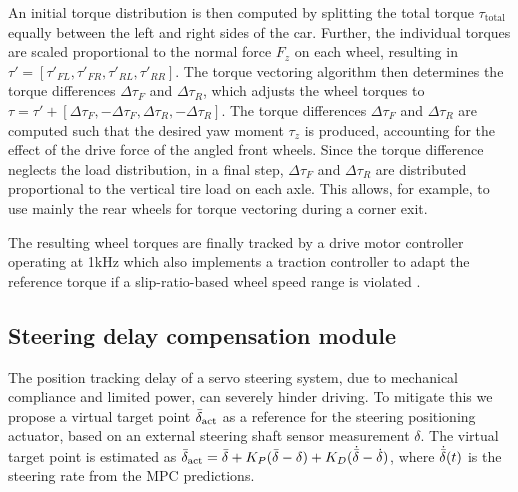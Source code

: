 An initial torque distribution is then computed by splitting the total torque $\tau_{\text{total}}$ equally between the left and right sides of the car. Further, the individual torques are scaled proportional to the normal force $F_z$ on each wheel, resulting in $\tau'=[\tau'_{FL}, \tau'_{FR},\tau'_{RL},\tau'_{RR}]$. The torque vectoring algorithm then determines the torque differences $\Delta\tau_F$ and $\Delta\tau_R$, which adjusts the wheel torques to $\tau=\tau' + [ \Delta\tau_F, -\Delta\tau_F, \Delta\tau_R, -\Delta\tau_R]$. The torque differences $\Delta\tau_F$ and $\Delta\tau_R$ are computed such that the desired yaw moment $\tau_z$ is produced, accounting for the effect of the drive force of the angled front wheels. Since the torque difference neglects the load distribution, in a final step, $\Delta\tau_F$ and $\Delta\tau_R$ are distributed proportional to the vertical tire load on each axle. This allows, for example, to use mainly the rear wheels for torque vectoring during a corner exit. 

The resulting wheel torques are finally tracked by a drive motor controller operating at 1kHz which also implements a traction controller to adapt the reference torque if a slip-ratio-based wheel speed range is violated \cite{ev_traction_control}. 

\subsection{Steering delay compensation module}
The position tracking delay of a servo steering system, due to mechanical compliance and limited power, can severely hinder driving.
To mitigate this we propose a virtual target point $\bar{\delta}_{\text{act}}$ as a reference for the steering positioning actuator, based on an external steering shaft sensor measurement $\delta$.
The virtual target point is estimated as 
$\bar{\delta}_{\text{act}} = \bar{\delta} + K_P (\bar{\delta}-\delta) + K_D (\dot{\bar{\delta}} - \dot{\delta})$, where $\dot{\bar{\delta}}(t)$ is the steering rate from the MPC predictions. 
